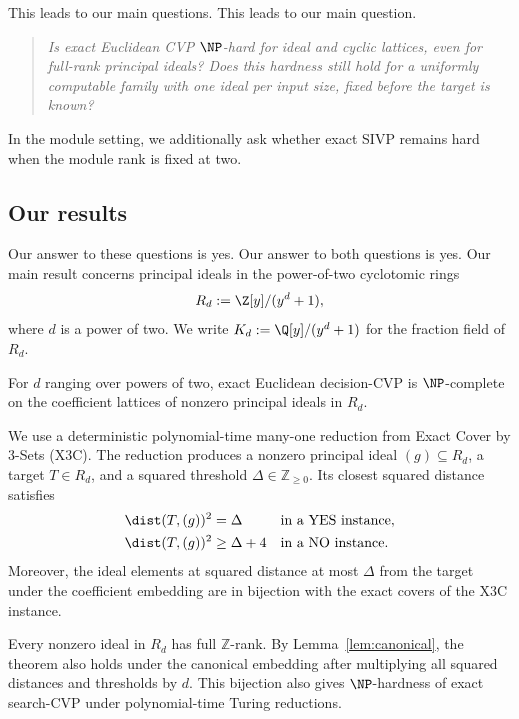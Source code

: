 \ifdefined\withModuleSIVP
{This leads to our main questions.}
\else
This leads to our main question.
\fi

\begin{quote}
\emph{Is exact Euclidean CVP \(\NP\)-hard for ideal and cyclic lattices, even
for full-rank principal ideals?  Does this hardness still hold for a
uniformly computable family with one ideal per input size, fixed before the
target is known?}
\end{quote}

\ifdefined\withModuleSIVP
{In the module setting, we additionally ask whether exact SIVP
remains hard when the module rank is fixed at two.}
\fi

\subsection{Our results}
\label{sec:intro-results}

\ifdefined\withModuleSIVP
{Our answer to these questions is yes.}
\else
Our answer to both questions is yes.
\fi
Our main result concerns principal ideals in the power-of-two cyclotomic rings
\[
 R_d\mathrel{:=}\Z[y]/(y^d+1),
\]
where \(d\) is a power of two.
\ifdefined\withModuleSIVP
{We write \(K_d\mathrel{:=}\Q[y]/(y^d+1)\) for the fraction
field of \(R_d\).}
\fi

\begin{theorem}
\label{thm:intro-principal-ideal}
For \(d\) ranging over powers of two, exact Euclidean decision-CVP is
\(\NP\)-complete on the coefficient lattices of nonzero principal ideals in
\(R_d\).
\end{theorem}

We use a deterministic polynomial-time many-one reduction
from Exact Cover by 3-Sets (X3C).  The reduction produces a nonzero principal
ideal \((g)\subseteq R_d\), a target \(T\in R_d\), and a squared threshold
\(\Delta\in\mathbb Z_{\geq0}\).  Its closest squared distance satisfies
\[
\begin{aligned}
 {\dist(T,(g))^2}
   &=\Delta &&\text{in a YES instance},\\
 {\dist(T,(g))^2}
   &\geq\Delta+4 &&\text{in a NO instance}.
\end{aligned}
\]
Moreover, the ideal elements at squared distance at most \(\Delta\) from the
target under the coefficient embedding are in bijection with the exact covers
of the X3C instance.

Every nonzero ideal in \(R_d\) has full \(\mathbb Z\)-rank.
By Lemma~\ref{lem:canonical}, the theorem also holds under the
canonical embedding after multiplying all squared distances and thresholds
by \(d\).
This bijection also gives
\(\NP\)-hardness of exact search-CVP under polynomial-time Turing
reductions.

